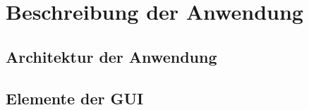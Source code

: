 \chapter{Beschreibung der Anwendung} %
\section{Architektur der Anwendung} %
\Blindtext
\section{Elemente der GUI} %
\Blindtext

